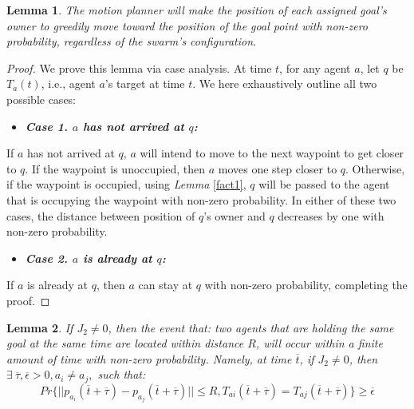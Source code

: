 \documentclass[journal]{IEEEtran}
\newtheorem{lemma}{Lemma}[subsection]
\begin{document}
\begin{lemma} 
The \textit{motion planner} will make the position of each assigned goal's owner to greedily move toward the position of the goal point with non-zero probability, regardless of the swarm's configuration.
\label{moves}
\end{lemma}
\begin{proof}
We prove this lemma via case analysis. At time $t$, for any agent $a$, let $q$ be $T_{a}(t)$, i.e., agent $a$'s target at time $t$. We here exhaustively outline all two possible cases:


\begin{itemize}
\item \textit{\textbf{Case 1. $a$ has not arrived at $q$:}}
\end{itemize}

If $a$ has not arrived at $q$, $a$ will intend to move to the next waypoint to get closer to $q$. If the waypoint is unoccupied, then $a$ moves one step closer to $q$. Otherwise, if the waypoint is occupied, using \textit{Lemma} \ref{fact1}, $q$ will be passed to the agent that is occupying the waypoint with non-zero probability. In either of these two cases, the distance between position of $q$'s owner and $q$ decreases by one with non-zero probability. 


\begin{itemize}
\item \textit{\textbf{Case 2. $a$ is already at $q$:}}
\end{itemize}

If $a$ is already at $q$, then $a$ can stay at $q$ with non-zero probability, completing the proof. 
\end{proof}
\begin{lemma}
If $J_2 \neq 0$, then the event that: two agents that are holding the same goal at the same time are located within distance $R$, will occur within a finite amount of time with non-zero probability. Namely, at time $\overline{t}$, if $J_2 \neq 0$, then $\exists ~\overline{\tau}, \overline{\epsilon} > 0, a_i \neq a_j,$ such that:
$$Pr\{||p_{a_i}(\overline{t} + \overline{\tau}) - p_{a_j}(\overline{t} + \overline{\tau})||\leq R, T_{ai}(\overline{t} + \overline{\tau}) = T_{aj}(\overline{t} + \overline{\tau})\} \geq \overline{\epsilon}$$
\label{lemmameet}
\end{lemma}
\end{document}
